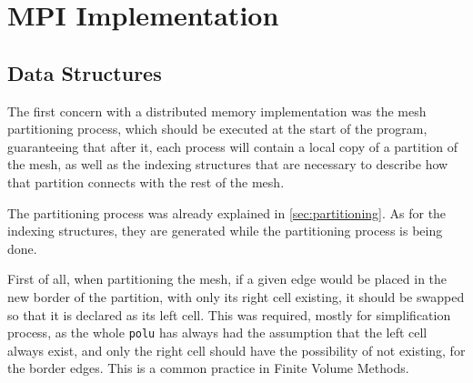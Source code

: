 \section{MPI Implementation}
\label{sec:implementation}

\subsection{Data Structures}
\label{subsec:structs}

The first concern with a distributed memory implementation was the mesh partitioning process, which should be executed at the start of the program, guaranteeing that after it, each process will contain a local copy of a partition of the mesh, as well as the indexing structures that are necessary to describe how that partition connects with the rest of the mesh.

The partitioning process was already explained in \cref{sec:partitioning}. As for the indexing structures, they are generated while the partitioning process is being done.

First of all, when partitioning the mesh, if a given edge would be placed in the new border of the partition, with only its right cell existing, it should be swapped so that it is declared as its left cell. This was required, mostly for simplification process, as the whole \texttt{polu} has always had the assumption that the left cell always exist, and only the right cell should have the possibility of not existing, for the border edges. This is a common practice in Finite Volume Methods.

